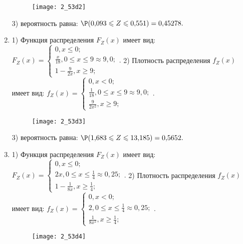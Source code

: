 \documentclass[a4paper,12pt]{article}
\begin{document}
\begin{enumerate}
\begin{figure}[H]
    \texttt{[image: 2\_53d2]}
\end{figure}


3) вероятность равна:
$
\P(0,\!093\leqslant Z\leqslant 0,\!551)=
0,\!45278.
$



\item


1) Функция распределения $F_Z(x)$ имеет вид:
$
F_Z(x)=\left\{
\begin{array}{l}
0, x\leqslant 0;\\
\frac{x}{18}, 0\leqslant x\leqslant 9\approx 9,\!0;\\
1 - \frac{9}{2 x}, x\geqslant9;
\end{array}.
\right.
$
2) Плотность распределения $f_Z(x)$ имеет вид:
$
f_Z(x)=\left\{
\begin{array}{l}
0, x<0;\\
\frac{1}{18}, 0\leqslant x\leqslant 9\approx 9,\!0;\\
\frac{9}{2 x^{2}}, x\geqslant9;
\end{array}.
\right.
$


\begin{figure}[H]
    \texttt{[image: 2\_53d3]}
\end{figure}


3) вероятность равна:
$
\P(1,\!683\leqslant Z\leqslant 13,\!185)=
0,\!5652.
$



\item


1) Функция распределения $F_Z(x)$ имеет вид:
$
F_Z(x)=\left\{
\begin{array}{l}
0, x\leqslant 0;\\
2 x, 0\leqslant x\leqslant \frac{1}{4}\approx 0,\!25;\\
1 - \frac{1}{8 x}, x\geqslant\frac{1}{4};
\end{array}.
\right.
$
2) Плотность распределения $f_Z(x)$ имеет вид:
$
f_Z(x)=\left\{
\begin{array}{l}
0, x<0;\\
2, 0\leqslant x\leqslant \frac{1}{4}\approx 0,\!25;\\
\frac{1}{8 x^{2}}, x\geqslant\frac{1}{4};
\end{array}.
\right.
$


\begin{figure}[H]
    \texttt{[image: 2\_53d4]}
\end{figure}



\end{enumerate}
\end{document}
